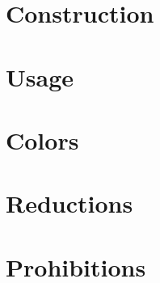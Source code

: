 
\section{Construction}
\section{Usage}
\section{Colors}
\section{Reductions}
\section{Prohibitions}

